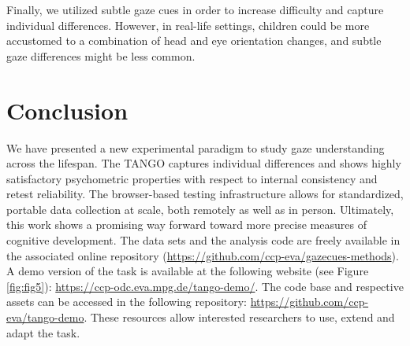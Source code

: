 \documentclass[
  man,floatsintext]{apa7}
\begin{document}
Finally, we utilized subtle gaze cues in order to increase difficulty and capture individual differences.
However, in real-life settings, children could be more accustomed to a combination of head and eye orientation changes, and subtle gaze differences might be less common.

\hypertarget{conclusion}{%
\section{Conclusion}\label{conclusion}}

We have presented a new experimental paradigm to study gaze understanding across the lifespan.
The TANGO captures individual differences and shows highly satisfactory psychometric properties with respect to internal consistency and retest reliability.
The browser-based testing infrastructure allows for standardized, portable data collection at scale, both remotely as well as in person.
Ultimately, this work shows a promising way forward toward more precise measures of cognitive development.
The data sets and the analysis code are freely available in the associated online repository (\url{https://github.com/ccp-eva/gazecues-methods}).
A demo version of the task is available at the following website (see Figure \ref{fig:fig5}): \url{https://ccp-odc.eva.mpg.de/tango-demo/}.
The code base and respective assets can be accessed in the following repository: \url{https://github.com/ccp-eva/tango-demo}.
These resources allow interested researchers to use, extend and adapt the task.
\end{document}
